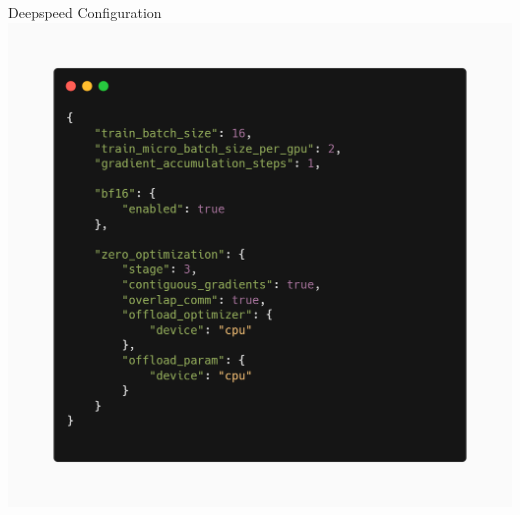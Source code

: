\begin{frame}{Deepspeed Configuration}
    \centering
    \includegraphics[scale=.18]{figures/ds_config.png}
\end{frame}